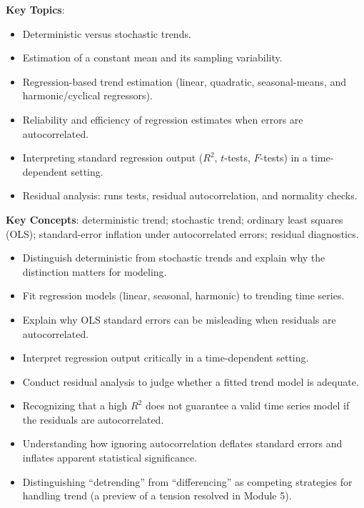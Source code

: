 \documentclass[11pt]{article}
\newcommand{\keytopics}{\textbf{\color{modblue}Key Topics}}
\newcommand{\keyconcepts}{\textbf{\color{modblue}Key Concepts}}
\begin{document}
\keytopics:
\begin{itemize}
  \item Deterministic versus stochastic trends.
  \item Estimation of a constant mean and its sampling variability.
  \item Regression-based trend estimation (linear, quadratic, seasonal-means, and harmonic/cyclical regressors).
  \item Reliability and efficiency of regression estimates when errors are autocorrelated.
  \item Interpreting standard regression output ($R^2$, $t$-tests, $F$-tests) in a time-dependent setting.
  \item Residual analysis: runs tests, residual autocorrelation, and normality checks.
\end{itemize}

\keyconcepts: deterministic trend; stochastic trend; ordinary least squares (OLS); standard-error inflation under autocorrelated errors; residual diagnostics.

\begin{objectives}
\begin{itemize}
  \item Distinguish deterministic from stochastic trends and explain why the distinction matters for modeling.
  \item Fit regression models (linear, seasonal, harmonic) to trending time series.
  \item Explain why OLS standard errors can be misleading when residuals are autocorrelated.
  \item Interpret regression output critically in a time-dependent setting.
  \item Conduct residual analysis to judge whether a fitted trend model is adequate.
\end{itemize}
\end{objectives}

\begin{difficult}
\begin{itemize}
  \item Recognizing that a high $R^2$ does not guarantee a valid time series model if the residuals are autocorrelated.
  \item Understanding how ignoring autocorrelation deflates standard errors and inflates apparent statistical significance.
  \item Distinguishing ``detrending'' from ``differencing'' as competing strategies for handling trend (a preview of a tension resolved in Module 5).
\end{itemize}
\end{difficult}
\end{document}
